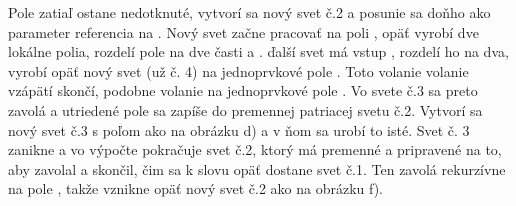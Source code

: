 {}



Pole  zatiaľ ostane nedotknuté, vytvorí sa nový svet č.2 a posunie sa 
doňho ako parameter
referencia na . Nový svet začne pracovať na poli , opäť
vyrobí dve lokálne polia, rozdelí pole na dve časti  a .
ďalší svet má vstup , rozdelí ho na dva, vyrobí opäť nový svet (už č. 4) 
na jednoprvkové pole . Toto volanie volanie vzápätí skončí, podobne
volanie na jednoprvkové pole . Vo svete č.3 sa preto zavolá 
a utriedené pole  sa zapíše do premennej  patriacej svetu č.2.
Vytvorí sa nový svet č.3 s poľom  ako na obrázku d) a v ňom sa urobí to isté.
Svet č. 3 zanikne a vo výpočte pokračuje svet č.2, ktorý má premenné  a 
pripravené na to, aby zavolal  a skončil, čim sa k slovu opäť dostane svet č.1.
Ten zavolá rekurzívne  na pole , takže vznikne opäť nový svet č.2
ako na obrázku f).


